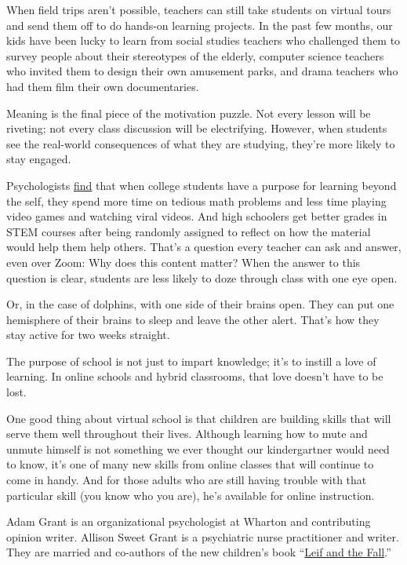 When field trips aren't possible, teachers can still take students on
virtual tours and send them off to do hands-on learning projects. In the
past few months, our kids have been lucky to learn from social studies
teachers who challenged them to survey people about their stereotypes of
the elderly, computer science teachers who invited them to design their
own amusement parks, and drama teachers who had them film their own
documentaries.

Meaning is the final piece of the motivation puzzle. Not every lesson
will be riveting; not every class discussion will be electrifying.
However, when students see the real-world consequences of what they are
studying, they're more likely to stay engaged.

Psychologists \href{https://psycnet.apa.org/buy/2014-38071-001}{find}
that when college students have a purpose for learning beyond the self,
they spend more time on tedious math problems and less time playing
video games and watching viral videos. And high schoolers get better
grades in STEM courses after being randomly assigned to reflect on how
the material would help them help others. That's a question every
teacher can ask and answer, even over Zoom: Why does this content
matter? When the answer to this question is clear, students are less
likely to doze through class with one eye open.

Or, in the case of dolphins, with one side of their brains open. They
can put one hemisphere of their brains to sleep and leave the other
alert. That's how they stay active for two weeks straight.

The purpose of school is not just to impart knowledge; it's to instill a
love of learning. In online schools and hybrid classrooms, that love
doesn't have to be lost.

One good thing about virtual school is that children are building skills
that will serve them well throughout their lives. Although learning how
to mute and unmute himself is not something we ever thought our
kindergartner would need to know, it's one of many new skills from
online classes that will continue to come in handy. And for those adults
who are still having trouble with that particular skill (you know who
you are), he's available for online instruction.

Adam Grant is an organizational psychologist at Wharton and contributing
opinion writer. Allison Sweet Grant is a psychiatric nurse practitioner
and writer. They are married and co-authors of the new children's book
``\href{https://www.amazon.com/Leif-Fall-Allison-Sweet-Grant/dp/1984815490}{Leif
and the Fall}.''

